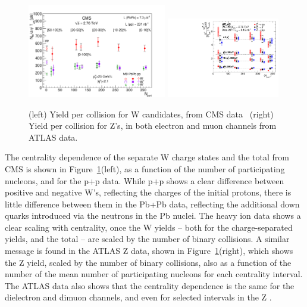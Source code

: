 \begin{figure}[t]
\begin{center}
\includegraphics[width=0.54\textwidth]{electroweak_figs/Fig2.pdf}
\includegraphics[width=0.44\textwidth]{electroweak_figs/fig_04.pdf}
\caption[]{(left) Yield per collision for W candidates, from CMS data~\cite{Chatrchyan:2012nt} (right) Yield per collision for Z's, in both electron and muon channels from ATLAS data.~\cite{Aad:2012ew}}
\label{fig:pas:zw_cent}
\end{center}
\end{figure}

The centrality dependence of the separate W charge states and the total from CMS 
is shown in Figure~\ref{fig:pas:zw_cent}(left), 
as a function of the number of participating nucleons, and for the p+p data.  
While p+p shows a clear difference between positive and negative W's, reflecting the charges of the initial protons, there is little
difference between them in the Pb+Pb data, reflecting the additional down quarks introduced via the neutrons in the Pb nuclei.
The heavy ion data shows a clear scaling with centrality, once the W yields -- both for the charge-separated yields, and the
total -- are scaled by the number of binary collisions.
A similar message is found in the ATLAS Z data, shown in Figure~\ref{fig:pas:zw_cent}(right), which shows the Z yield, scaled by 
the number of binary collisions, also as a function of the number of the mean number of participating nucleons for each
centrality interval.  The ATLAS data also shows that the centrality dependence is the same for the dielectron and dimuon channels,
and even for selected intervals in the Z \pT.

